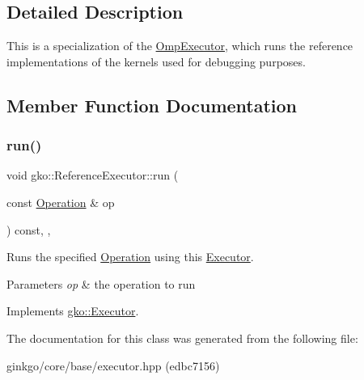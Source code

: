 \subsection{Detailed Description}
This is a specialization of the \hyperlink{classgko_1_1OmpExecutor}{Omp\+Executor}, which runs the reference implementations of the kernels used for debugging purposes. 

\subsection{Member Function Documentation}
\mbox{\label{classgko_1_1ReferenceExecutor_a82b41b42dbd26e8ac5b0146de79e5d34}} 
\subsubsection{\texorpdfstring{run()}{run()}}
{\footnotesize\ttfamily void gko\+::\+Reference\+Executor\+::run (\begin{DoxyParamCaption}\item[{const \hyperlink{classgko_1_1Operation}{Operation} \&}]{op }\end{DoxyParamCaption}) const\hspace{0.3cm}{\ttfamily [inline]}, {\ttfamily [override]}, {\ttfamily [virtual]}}



Runs the specified \hyperlink{classgko_1_1Operation}{Operation} using this \hyperlink{classgko_1_1Executor}{Executor}. 


\begin{DoxyParams}{Parameters}
{\em op} & the operation to run \\
\hline
\end{DoxyParams}


Implements \hyperlink{classgko_1_1Executor_a1de8e2668b76e66690acf5eef9e8324d}{gko\+::\+Executor}.



The documentation for this class was generated from the following file\+:\begin{DoxyCompactItemize}
\item 
ginkgo/core/base/executor.\+hpp (edbc7156)\end{DoxyCompactItemize}

